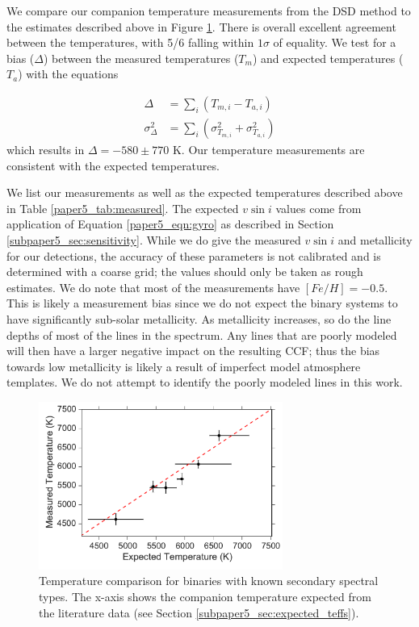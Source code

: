 We compare our companion temperature measurements from the DSD method to the estimates described above in Figure \ref{paper5_fig:known}. There is overall excellent agreement between the temperatures, with 5/6 falling within $1 \sigma$ of equality. We test for a bias ($\Delta$) between the measured temperatures ($T_m$) and expected temperatures ($T_a$) with the equations

\begin{eqnarray}
\Delta &= \sum_i(T_{m,i} - T_{a,i}) \\
\sigma_{\Delta}^2 &= \sum_i (\sigma_{T_{m,i}}^2 + \sigma_{T_{a,i}}^2)
\end{eqnarray}
which results in $\Delta = -580 \pm 770$ K. Our temperature measurements are consistent with the expected temperatures.

We list our measurements as well as the expected temperatures described above in Table \ref{paper5_tab:measured}. The expected $v\sin{i}$ values come from application of Equation \ref{paper5_eqn:gyro} as described in Section \ref{subpaper5_sec:sensitivity}. While we do give the measured $v\sin{i}$ and metallicity for our detections, the accuracy of these parameters is not calibrated and is determined with a coarse grid; the values should only be taken as rough estimates. We do note that most of the measurements have $[Fe/H] = -0.5$. This is likely a measurement bias since we do not expect the binary systems to have significantly sub-solar metallicity. As metallicity increases, so do the line depths of most of the lines in the spectrum. Any lines that are poorly modeled will then have a larger negative impact on the resulting CCF; thus the bias towards low metallicity is likely a result of imperfect model atmosphere templates. We do not attempt to identify the poorly modeled lines in this work.



\begin{figure}
        \centering
        \includegraphics[width=80mm]{Figures/paper5_Known_Binaries.pdf}
        
        \caption{Temperature comparison for binaries with known secondary spectral types. The x-axis shows the companion temperature expected from the literature data (see Section \ref{subpaper5_sec:expected_teffs}).}
         \label{paper5_fig:known}
\end{figure}


